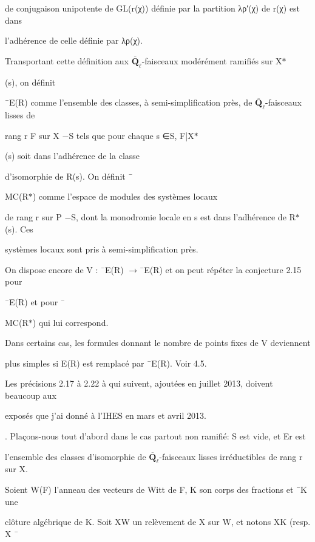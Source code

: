 \documentclass[11pt]{article}
\begin{document}
\noindent de conjugaison unipotente de GL(r(χ)) définie par la partition λρ′(χ) de r(χ) est dans\par
\noindent l’adhérence de celle définie par λρ(χ).\par
\noindent Transportant cette définition aux \(\overline{\mathbf Q}_{\ell}\)-faisceaux modérément ramifiés sur X\(*\)\par
\noindent (s), on définit\par
\noindent ¯E(R) comme l’ensemble des classes, à semi-simplification près, de \(\overline{\mathbf Q}_{\ell}\)-faisceaux lisses de\par
\noindent rang r F sur X −S tels que pour chaque s ∈S, F|X\(*\)\par
\noindent (s) soit dans l’adhérence de la classe\par
\noindent d’isomorphie de R(s). On définit ¯\par
\noindent MC(R\(*\)) comme l’espace de modules des systèmes locaux\par
\noindent de rang r sur P −S, dont la monodromie locale en s est dans l’adhérence de R\(*\)(s). Ces\par
\noindent systèmes locaux sont pris à semi-simplification près.\par
\noindent On dispose encore de V : ¯E(R) \(\to\)¯E(R) et on peut répéter la conjecture 2.15 pour\par
\noindent ¯E(R) et pour ¯\par
\noindent MC(R\(*\)) qui lui correspond.\par
\noindent Dans certains cas, les formules donnant le nombre de points fixes de V deviennent\par
\noindent plus simples si E(R) est remplacé par ¯E(R). Voir 4.5.\par
\medskip
\noindent Les précisions 2.17 à 2.22 à qui suivent, ajoutées en juillet 2013, doivent beaucoup aux\par
\noindent exposés que j’ai donné à l’IHES en mars et avril 2013.\par
{}. Plaçons-nous tout d’abord dans le cas partout non ramifié: S est vide, et Er est\par
\noindent l’ensemble des classes d’isomorphie de \(\overline{\mathbf Q}_{\ell}\)-faisceaux lisses irréductibles de rang r sur X.\par
\noindent Soient W(F) l’anneau des vecteurs de Witt de F, K son corps des fractions et ¯K une\par
\noindent clôture algébrique de K. Soit XW un relèvement de X sur W, et notons XK (resp. X ¯\par
\end{document}
